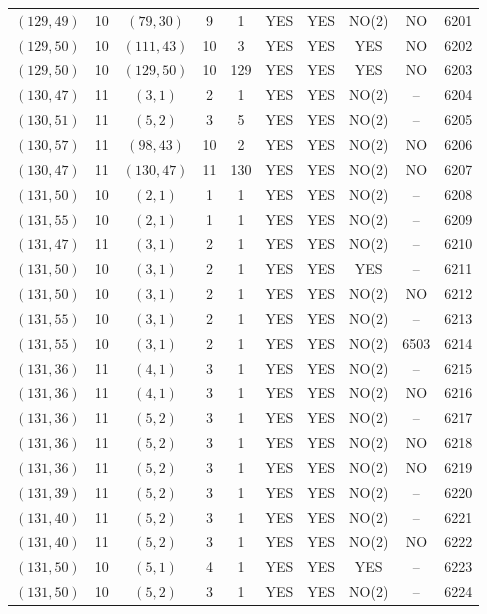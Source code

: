 \begin{longtable}{|c|c|c|c|c|c|c|c|c|c|}
$(129, 49)$ & 10 & $(79, 30)$ & 9 & 1 & YES & YES & NO(2) & NO & 6201\\
$(129, 50)$ & 10 & $(111, 43)$ & 10 & 3 & YES & YES & YES & NO & 6202\\
$(129, 50)$ & 10 & $(129, 50)$ & 10 & 129 & YES & YES & YES & NO & 6203\\
$(130, 47)$ & 11 & $(3, 1)$ & 2 & 1 & YES & YES & NO(2) & -- & 6204\\
$(130, 51)$ & 11 & $(5, 2)$ & 3 & 5 & YES & YES & NO(2) & -- & 6205\\
$(130, 57)$ & 11 & $(98, 43)$ & 10 & 2 & YES & YES & NO(2) & NO & 6206\\
$(130, 47)$ & 11 & $(130, 47)$ & 11 & 130 & YES & YES & NO(2) & NO & 6207\\
$(131, 50)$ & 10 & $(2, 1)$ & 1 & 1 & YES & YES & NO(2) & -- & 6208\\
$(131, 55)$ & 10 & $(2, 1)$ & 1 & 1 & YES & YES & NO(2) & -- & 6209\\
$(131, 47)$ & 11 & $(3, 1)$ & 2 & 1 & YES & YES & NO(2) & -- & 6210\\
$(131, 50)$ & 10 & $(3, 1)$ & 2 & 1 & YES & YES & YES & -- & 6211\\
$(131, 50)$ & 10 & $(3, 1)$ & 2 & 1 & YES & YES & NO(2) & NO & 6212\\
$(131, 55)$ & 10 & $(3, 1)$ & 2 & 1 & YES & YES & NO(2) & -- & 6213\\
$(131, 55)$ & 10 & $(3, 1)$ & 2 & 1 & YES & YES & NO(2) & 6503 & 6214\\
$(131, 36)$ & 11 & $(4, 1)$ & 3 & 1 & YES & YES & NO(2) & -- & 6215\\
$(131, 36)$ & 11 & $(4, 1)$ & 3 & 1 & YES & YES & NO(2) & NO & 6216\\
$(131, 36)$ & 11 & $(5, 2)$ & 3 & 1 & YES & YES & NO(2) & -- & 6217\\
$(131, 36)$ & 11 & $(5, 2)$ & 3 & 1 & YES & YES & NO(2) & NO & 6218\\
$(131, 36)$ & 11 & $(5, 2)$ & 3 & 1 & YES & YES & NO(2) & NO & 6219\\
$(131, 39)$ & 11 & $(5, 2)$ & 3 & 1 & YES & YES & NO(2) & -- & 6220\\
$(131, 40)$ & 11 & $(5, 2)$ & 3 & 1 & YES & YES & NO(2) & -- & 6221\\
$(131, 40)$ & 11 & $(5, 2)$ & 3 & 1 & YES & YES & NO(2) & NO & 6222\\
$(131, 50)$ & 10 & $(5, 1)$ & 4 & 1 & YES & YES & YES & -- & 6223\\
$(131, 50)$ & 10 & $(5, 2)$ & 3 & 1 & YES & YES & NO(2) & -- & 6224\\

\end{longtable}
